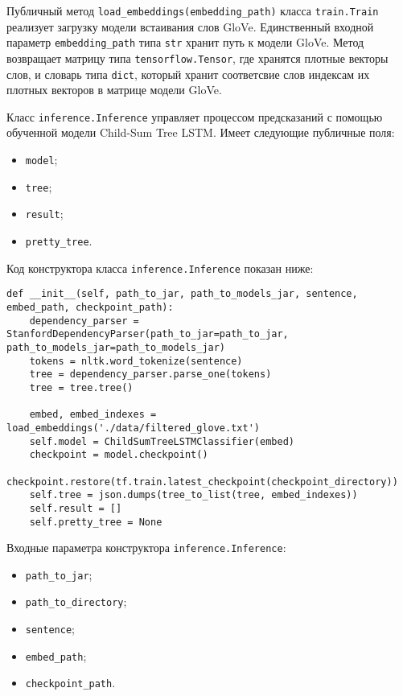 Публичный метод \texttt{load\_embeddings(embedding\_path)} класса \texttt{train.Train} реализует загрузку модели встаивания слов GloVe. Единственный входной параметр \texttt{embedding\_path} типа \texttt{str} хранит путь к модели GloVe. Метод возвращает матрицу типа \texttt{tensorflow.Tensor}, где хранятся плотные векторы слов, и словарь типа \texttt{dict}, который хранит соответсвие слов индексам их плотных векторов в матрице модели GloVe.

Класс \texttt{inference.Inference} управляет процессом предсказаний с помощью обученной модели Child-Sum Tree LSTM\@. Имеет следующие публичные поля:
\begin{itemize}
\item \texttt{model};
\item \texttt{tree};
\item \texttt{result};
\item \texttt{pretty\_tree}.
\end{itemize}

Код конструктора класса \texttt{inference.Inference} показан ниже:

\medskip
\begin{lstlisting}[style=Python]
  def __init__(self, path_to_jar, path_to_models_jar, sentence, embed_path, checkpoint_path):
    dependency_parser = StanfordDependencyParser(path_to_jar=path_to_jar, path_to_models_jar=path_to_models_jar)
    tokens = nltk.word_tokenize(sentence)
    tree = dependency_parser.parse_one(tokens)
    tree = tree.tree()

    embed, embed_indexes = load_embeddings('./data/filtered_glove.txt')
    self.model = ChildSumTreeLSTMClassifier(embed)
    checkpoint = model.checkpoint()
    checkpoint.restore(tf.train.latest_checkpoint(checkpoint_directory))
    self.tree = json.dumps(tree_to_list(tree, embed_indexes))
    self.result = []
    self.pretty_tree = None
\end{lstlisting}
\medskip

Входные параметра конструктора \texttt{inference.Inference}:
\begin{itemize}
\item \texttt{path\_to\_jar};
\item \texttt{path\_to\_directory};
\item \texttt{sentence};
\item \texttt{embed\_path};
\item \texttt{checkpoint\_path}.
\end{itemize}

